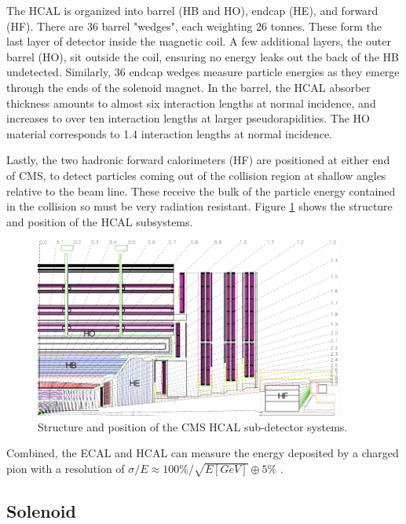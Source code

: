  The HCAL is organized into barrel (HB and HO), endcap (HE), and forward (HF). There are 36 barrel "wedges", each weighting 26 tonnes. These form the last layer of detector inside the magnetic coil. A few additional layers, the outer barrel (HO), sit outside the coil, ensuring no energy leaks out the back of the HB undetected. Similarly, 36 endcap wedges measure particle energies as they emerge through the ends of the solenoid magnet. In the barrel, the HCAL absorber thickness amounts to almost six interaction lengths at normal incidence, and increases to over ten interaction lengths at larger pseudorapidities. The HO material corresponds to 1.4 interaction lengths at normal incidence.

 Lastly, the two hadronic forward calorimeters (HF) are positioned at either end of CMS, to detect particles coming out of the collision region at shallow angles relative to the beam line. These receive the bulk of the particle energy contained in the collision so must be very radiation resistant. Figure \ref{fig:cmshcal} shows the structure and position of the HCAL subsystems. 

     \begin{figure}[h]
 	\centering
 	\includegraphics[width=0.9\textwidth]{figures/HCAL_subdet.pdf}
 	\singlespace
 	\caption{Structure and position of the CMS HCAL sub-detector systems.}
 	\label{fig:cmshcal}
	 \end{figure}

Combined, the ECAL and HCAL can measure the energy deposited by a charged pion with a resolution of $\sigma/E\approx100\%/\sqrt{E[GeV]}\oplus5\%$ \cite{Yazgan_2009}.

 \subsection{Solenoid}


